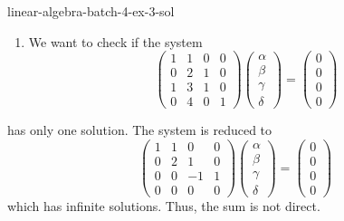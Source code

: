 \documentclass[preview]{standalone}
\begin{document}
\begin{snippetsolution}{linear-algebra-batch-4-ex-3-sol}{}
\begin{enumerate}
\[\begin{pmatrix}
                \beta \\
                \gamma \\
                \delta
            \end{pmatrix}
            =
            \begin{pmatrix}
                x_1 \\
                x_2 \\
                x_4 - 2x_2 \\
                x_3 -x_1-x_2
            \end{pmatrix}
        \]
        which has no solutions if \(x_3 - x_1 - x_2 \neq 0\).
        \item We want to check if the system
        \[
            \begin{pmatrix}
                1 & 1 & 0 & 0 \\
                0 & 2 & 1 & 0 \\
                1 & 3 & 1 & 0 \\
                0 & 4 & 0 & 1
            \end{pmatrix}
            \begin{pmatrix}
                \alpha \\
                \beta \\
                \gamma \\
                \delta
            \end{pmatrix}
            =
            \begin{pmatrix}
                0 \\
                0 \\
                0 \\
                0
            \end{pmatrix}
        \]
    \end{enumerate}
    has only one solution. The system is reduced to
    \[
        \begin{pmatrix}
            1 & 1 & 0 & 0 \\
            0 & 2 & 1 & 0 \\
            0 & 0 & -1 & 1 \\
            0 & 0 & 0 & 0
        \end{pmatrix}
        \begin{pmatrix}
            \alpha \\
            \beta \\
            \gamma \\
            \delta
        \end{pmatrix}
        =
        \begin{pmatrix}
            0 \\
            0 \\
            0 \\
            0
        \end{pmatrix}
    \]
    which has infinite solutions. Thus, the sum is not direct.
\end{snippetsolution}
\end{document}
